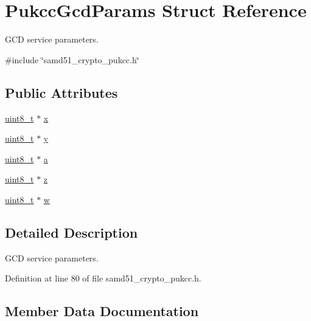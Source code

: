 \hypertarget{structPukccGcdParams}{}\section{Pukcc\+Gcd\+Params Struct Reference}
\label{structPukccGcdParams}


G\+CD service parameters.  




{\ttfamily \#include \char`\"{}samd51\+\_\+crypto\+\_\+pukcc.\+h\char`\"{}}

\subsection*{Public Attributes}
\begin{DoxyCompactItemize}
\item 
\hyperlink{stdint_8h_aba7bc1797add20fe3efdf37ced1182c5}{uint8\+\_\+t} $\ast$ \hyperlink{structPukccGcdParams_aaad588d0eb1db0d69f0fa1b93d2e4e67}{x}
\item 
\hyperlink{stdint_8h_aba7bc1797add20fe3efdf37ced1182c5}{uint8\+\_\+t} $\ast$ \hyperlink{structPukccGcdParams_a57fe6aea2a7ac5b68f180bf6db554a18}{y}
\item 
\hyperlink{stdint_8h_aba7bc1797add20fe3efdf37ced1182c5}{uint8\+\_\+t} $\ast$ \hyperlink{structPukccGcdParams_aa2ac5a55daafacaa034f186ce047c5a4}{a}
\item 
\hyperlink{stdint_8h_aba7bc1797add20fe3efdf37ced1182c5}{uint8\+\_\+t} $\ast$ \hyperlink{structPukccGcdParams_aaf07c87d429ef806d1b8441850ccbdf7}{z}
\item 
\hyperlink{stdint_8h_aba7bc1797add20fe3efdf37ced1182c5}{uint8\+\_\+t} $\ast$ \hyperlink{structPukccGcdParams_a7a0a058cf90e42593eb5ace26a93ea44}{w}
\end{DoxyCompactItemize}


\subsection{Detailed Description}
G\+CD service parameters. 

Definition at line 80 of file samd51\+\_\+crypto\+\_\+pukcc.\+h.



\subsection{Member Data Documentation}
\mbox{\label{structPukccGcdParams_aa2ac5a55daafacaa034f186ce047c5a4}} 
